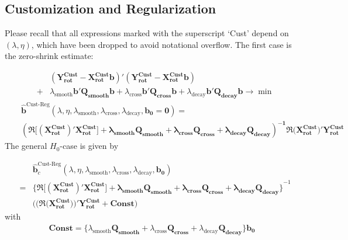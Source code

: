 \documentclass[11pt]{article}
\begin{document}
\subsection{Customization and Regularization}

Please recall that all expressions marked with the superscript `Cust' depend on $(\lambda,\eta)$, which have been dropped to avoid notational overflow. The first case is the zero-shrink estimate:

\begin{eqnarray*}
&&(\mathbf{Y_{\textrm{rot}}^{\textrm{Cust}}-X_{\textrm{rot}}^{\textrm{Cust}}b})'(\mathbf{Y_{\textrm{rot}}^{\textrm{Cust}}-X_{\textrm{rot}}^{\textrm{Cust}}b})\nonumber\\
&+&\lambda_{\textrm{smooth}}\mathbf{b'Q_{smooth}b}
+\lambda_{\textrm{cross}}\mathbf{b'Q_{cross}b}+\lambda_{\textrm{decay}}\mathbf{b'Q_{decay}b}\to\min
\end{eqnarray*}
\begin{eqnarray*}
&&\mathbf{\hat{b}}^{\textrm{Cust-Reg}}(\lambda,\eta,\lambda_{\textrm{smooth}},\lambda_{\textrm{cross}},\lambda_{\textrm{decay}},\mathbf{b_0=0})=\\
&&\mathbf{\left(\Re\Big[(X_{\textrm{rot}}^{\textrm{Cust} })' X_{\textrm{rot}}^{\textrm{Cust}}\Big]+
\lambda_{\textrm{smooth}}\mathbf{Q_{smooth}}+\lambda_{\textrm{cross}}\mathbf{Q_{cross}}+\lambda_{\textrm{decay}}\mathbf{Q_{decay}}
\right)^{-1}\Re(X_{\textrm{rot}}^{\textrm{Cust}}})'
\mathbf{Y_{\textrm{rot}}^{\textrm{Cust}}}\nonumber
\end{eqnarray*}
The general $H_0$-case is given by

\begin{eqnarray*}
&&\mathbf{\hat{b}}^{\textrm{Cust-Reg}}_c(\lambda,\eta,\lambda_{\textrm{smooth}},\lambda_{\textrm{cross}},\lambda_{\textrm{decay}},\mathbf{b_0})\nonumber\\
&=&\mathbf{\Big\{\Re\Big[(X_{\textrm{rot}}^{\textrm{Cust} })' X_{\textrm{rot}}^{\textrm{Cust}}\Big]+
\lambda_{\textrm{smooth}}\mathbf{Q_{smooth}}+\lambda_{\textrm{cross}}\mathbf{Q_{cross}}+\lambda_{\textrm{decay}}\mathbf{Q_{decay}}
\Big\}}^{-1}\nonumber\\
&&\Big((\Re(\mathbf{X_{\textrm{rot}}^{\textrm{Cust}}))}'
\mathbf{Y_{\textrm{rot}}^{\textrm{Cust}}}+\mathbf{Const}\Big)
\end{eqnarray*}
with 
\begin{eqnarray*}
\mathbf{Const}=\Big\{\lambda_{\textrm{smooth}}\mathbf{Q_{\textrm{smooth}}}+\lambda_{\textrm{cross}}\mathbf{Q_{\textrm{cross}}}+
\lambda_{\textrm{decay}}\mathbf{Q_{\textrm{decay}}}\Big\}\mathbf{b_0}
\end{eqnarray*}
\end{document}
